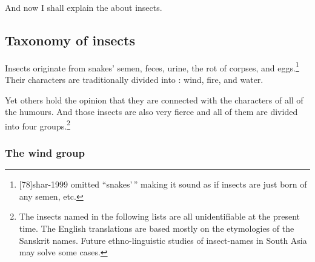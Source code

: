 \begin{translation}

\item[1]
 And now I shall explain the  about 
 insects.
 

\subsection{Taxonomy of insects}


\item [3] 

Insects originate from snakes' semen, feces, urine, the rot of corpses,
and eggs.\footnote{[78]{shar-1999} omitted “snakes'\,” making it 
sound as if insects are just born of any semen, etc.}  Their
characters are traditionally divided
into : wind, fire, and water.

\item[4]

Yet others hold the opinion that they are connected with the
characters of all of the humours. And those
insects are also very fierce and all of them are divided into four
groups.\footnote{The insects named in the following lists are all
    unidentifiable at the present time.  The English translations are
    based mostly on the etymologies of the Sanskrit names.  Future
    ethno-linguistic studies of insect-names in South Asia may solve some
    cases.}

\subsubsection{The wind group}


\end{translation}
